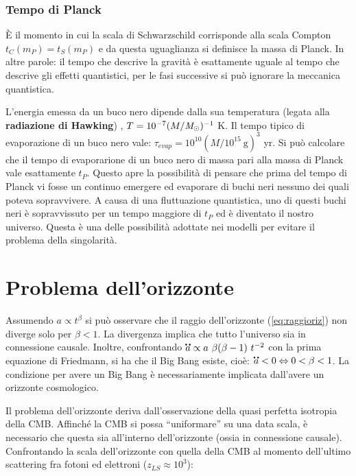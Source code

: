 \subsubsection{Tempo di Planck}
È il momento in cui la scala di Schwarzschild corrisponde alla scala Compton $t_C(m_P)=t_S(m_P)$ e da questa uguaglianza si definisce la massa di Planck. In altre parole: il tempo che descrive la gravità è esattamente uguale al tempo che descrive gli effetti quantistici, per le fasi successive si può ignorare la meccanica quantistica.

L'energia emessa da un buco nero dipende dalla sua temperatura (legata alla \textbf{radiazione di Hawking}) , $T=10^{-7} (M/\textit{M}_\odot)^{-1}$ K. Il tempo tipico di evaporazione di un buco nero vale: $\tau_{evap}=10^{10} (M/10^{15}~\textrm{g})^{3} $ yr. Si può calcolare che il tempo di evaporarione di un buco nero di massa pari alla massa di Planck vale esattamente $t_P$. Questo apre la possibilità di pensare che prima del tempo di Planck vi fosse un continuo emergere ed evaporare di buchi neri nessuno dei quali poteva sopravvivere. A causa di una fluttuazione quantistica, uno di questi buchi neri è sopravvissuto per un tempo maggiore di $t_P$ ed è diventato il nostro universo. Questa è una delle possibilità adottate nei modelli per evitare il problema della singolarità. 





\section{Problema dell'orizzonte}
Assumendo $a\propto t^\beta$ si può osservare che il raggio dell'orizzonte (\ref{eq:raggioriz}) non diverge solo per $\beta < 1$. La divergenza implica che tutto l'universo sia in connessione causale. Inoltre, confrontando $\accentset{\mbox{\large\bfseries ..}}{a}\propto a~\beta (\beta-1) ~t^{-2} $ con la prima equazione di Friedmann, si ha che il Big Bang esiste, cioè: $\accentset{\mbox{\large\bfseries ..}}{a} < 0 \Leftrightarrow 0 < \beta < 1$. La condizione per avere un Big Bang è necessariamente implicata dall'avere un orizzonte cosmologico. 

Il problema dell'orizzonte deriva dall'osservazione della quasi perfetta isotropia della CMB. Affinché la CMB si possa ``uniformare'' su una data scala, è necessario che questa sia all'interno dell'orizzonte (ossia in connessione causale). Confrontando la scala dell'orizzonte con quella della CMB al momento dell'ultimo scattering fra fotoni ed elettroni ($z_{LS}\approx 10^3$):

